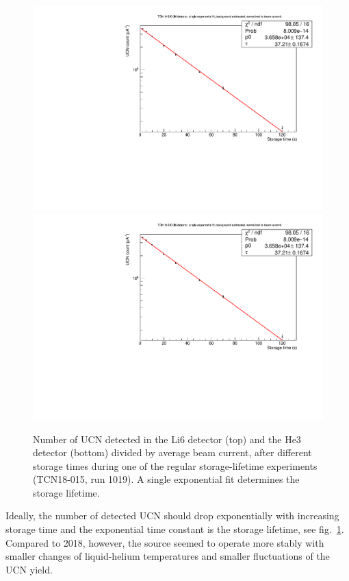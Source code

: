 \documentclass[10pt,letterpaper]{article}
\begin{document}
\begin{figure}
\centering
\includegraphics[width=\textwidth,page=1]{../storagelifetime/TCN19-020_1873.pdf}
\includegraphics[width=\textwidth,page=2]{../storagelifetime/TCN19-020_1873.pdf}
\caption{Number of UCN detected in the Li6 detector (top) and the He3 detector (bottom) divided by average beam current, after different storage times during one of the regular storage-lifetime experiments (TCN18-015, run 1019). A single exponential fit determines the storage lifetime.}
\label{fig:storagelifetime}
\end{figure}

Ideally, the number of detected UCN should drop exponentially with increasing storage time and the exponential time constant is the storage lifetime, see fig.~\ref{fig:storagelifetime}. Compared to 2018, however, the source seemed to operate more stably with smaller changes of liquid-helium temperatures and smaller fluctuations of the UCN yield.
\end{document}
